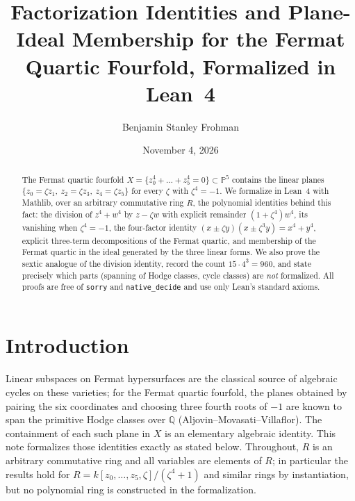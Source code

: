 \documentclass[11pt]{amsart}
\title[Factorization identities for the Fermat quartic fourfold]{Factorization Identities and Plane-Ideal Membership for the Fermat Quartic Fourfold, Formalized in Lean~4}
\author{Benjamin Stanley Frohman}
\date{November 4, 2026}
\theoremstyle{definition}
\theoremstyle{remark}
\begin{document}
\begin{abstract}
The Fermat quartic fourfold $X=\{z_0^4+\dots+z_5^4=0\}\subset\mathbb{P}^5$ contains the linear planes $\{z_0=\zeta z_1,\ z_2=\zeta z_3,\ z_4=\zeta z_5\}$ for every $\zeta$ with $\zeta^4=-1$. We formalize in Lean~4 with Mathlib, over an arbitrary commutative ring $R$, the polynomial identities behind this fact: the division of $z^4+w^4$ by $z-\zeta w$ with explicit remainder $(1+\zeta^4)w^4$, its vanishing when $\zeta^4=-1$, the four-factor identity $(x\pm\zeta y)(x\pm\zeta^3y)=x^4+y^4$, explicit three-term decompositions of the Fermat quartic, and membership of the Fermat quartic in the ideal generated by the three linear forms. We also prove the sextic analogue of the division identity, record the count $15\cdot4^3=960$, and state precisely which parts (spanning of Hodge classes, cycle classes) are \emph{not} formalized. All proofs are free of \texttt{sorry} and \texttt{native\_decide} and use only Lean's standard axioms.
\end{abstract}
\maketitle
{}\par


\section{Introduction}
Linear subspaces on Fermat hypersurfaces are the classical source of algebraic cycles on these varieties; for the Fermat quartic fourfold, the planes obtained by pairing the six coordinates and choosing three fourth roots of $-1$ are known to span the primitive Hodge classes over $\mathbb{Q}$ (Aljovin--Movasati--Villaflor). The containment of each such plane in $X$ is an elementary algebraic identity. This note formalizes those identities exactly as stated below. Throughout, $R$ is an arbitrary commutative ring and all variables are elements of $R$; in particular the results hold for $R=k[z_0,\dots,z_5,\zeta]/(\zeta^4+1)$ and similar rings by instantiation, but no polynomial ring is constructed in the formalization.
\end{document}
